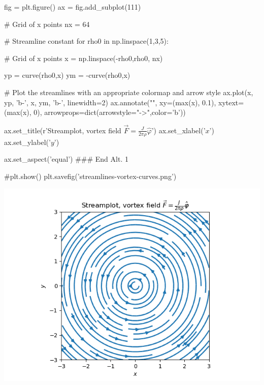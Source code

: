 \documentclass[%
oneside,                 %
final,                   %
10pt]{article}
\newenvironment{notice_mdfboxadmon}[1][]{
\begin{notice_mdfboxmdframed}[frametitle=#1]
}
{
\end{notice_mdfboxmdframed}
}
\begin{document}
\begin{notice_mdfboxadmon}
fig = plt.figure()
ax = fig.add_subplot(111)

# Grid of x points
nx = 64

# Streamline constant
for rho0 in np.linspace(1,3,5):

    # Grid of x points
    x = np.linspace(-rho0,rho0, nx)

    yp = curve(rho0,x)
    ym = -curve(rho0,x)

    # Plot the streamlines with an appropriate colormap and arrow style
    ax.plot(x, yp, 'b-', x, ym, 'b-', linewidth=2)
    ax.annotate("", xy=(max(x), 0.1), xytext=(max(x), 0), arrowprops=dict(arrowstyle="->",color='b'))

ax.set_title(r'Streamplot, vortex field $\vec{F} = \frac{J}{2\pi\rho}\hat\varphi$')
ax.set_xlabel('$x$')
ax.set_ylabel('$y$')

ax.set_aspect('equal')
### End Alt. 1

#plt.show()
plt.savefig('streamlines-vortex-curves.png')
\epypro




\vspace{6mm}

\centerline{\includegraphics[width=0.8\linewidth]{fig/streamlines-vortex.png}}

\vspace{6mm}
\end{notice_mdfboxadmon} %




\end{document}
